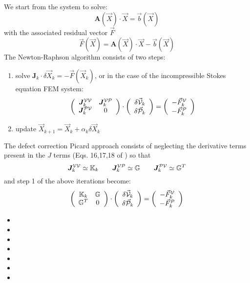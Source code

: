 We start from the system to solve:
\[
{\bm A}(\vec X) \cdot \vec X = \vec b(\vec X)
\]
with the associated residual vector $\vec F$ 
\[
\vec F(\vec X) = {\bm A}(\vec X) \cdot \vec X - \vec b(\vec X)
\]
The Newton-Raphson algorithm consists of two steps:
\begin{enumerate}
\item solve $\bm J_k \cdot \delta \vec X_k = -\vec F(\vec X_k)$, or in the 
case of the incompressible Stokes equation FEM system:
\[
\left(
\begin{array}{cc}
\bm J^{{\cal V}{\cal V}}_k & \bm J^{{\cal V}{\cal P}}_k \\
\bm J^{{\cal P}{\cal V}}_k & 0
\end{array}
\right)
\cdot
\left(
\begin{array}{c}
\delta \vec {\cal V}_k \\ \delta \vec {\cal P}_k
\end{array}
\right)
=
\left(
\begin{array}{c}
- \vec F_k^{\cal V} \\ -\vec F_k^{\cal P}
\end{array}
\right)
\]

\item update $\vec X_{k+1} = \vec X_k + \alpha_k \delta \vec X_k$
\end{enumerate}
The defect correction Picard approach consists of neglecting the derivative terms present 
in the $J$ terms (Eqs. 16,17,18 of \cite{frbt19}) so that 
\[
\bm J^{{\cal V}{\cal V}}_k \simeq {\mathbb{K}}_k 
\quad\quad
\bm J^{{\cal V}{\cal P}}_k \simeq {\mathbb{G}} 
\quad\quad
\bm J^{{\cal P}{\cal V}}_k \simeq {\mathbb{G}}^T
\]
and step 1 of the above iterations become:
\[
\left(
\begin{array}{cc}
{\mathbb{K}}_k & {\mathbb{G}} \\ {\mathbb{G}}^T & 0
\end{array}
\right)
\cdot
\left(
\begin{array}{c}
\delta \vec {\cal V}_k \\ \delta \vec {\cal P}_k
\end{array}
\right)
=
\left(
\begin{array}{c}
- \vec F_k^{\cal V} \\ -\vec F_k^{\cal P}
\end{array}
\right)
\]

\vspace{1cm}


\begin{itemize}
\item {}
\item {}
\item {}
\item {}
\item {}
\item {}
\item {}
\end{itemize}

